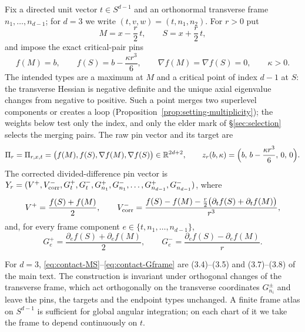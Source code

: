 \begin{definition}\label{def:contact-pins}
Fix a directed unit vector $t\in S^{d-1}$ and an orthonormal transverse frame $n_1,\dots,n_{d-1}$; for $d=3$ we write $(t,v,w)=(t,n_1,n_2)$. For $r>0$ put
\begin{equation}\label{eq:contact-MS}
M=x-\frac r2\,t,\qquad S=x+\frac r2\,t,
\end{equation}
and impose the exact critical-pair pins
\begin{equation}\label{eq:contact-pins}
f(M)=b,\qquad f(S)=b-\frac{\kappa r^3}6,\qquad\nabla f(M)=\nabla f(S)=0,\qquad\kappa>0 .
\end{equation}
The intended types are a maximum at $M$ and a critical point of index $d-1$ at $S$: the transverse Hessian is negative definite and the unique axial eigenvalue changes from negative to positive. Such a point merges two superlevel components or creates a loop (Proposition~\ref{prop:setting-multiplicity}); the weights below test only the index, and only the elder mark of \S\ref{sec:selection} selects the merging pairs. The raw pin vector and its target are
\begin{equation}\label{eq:contact-raw}
\Pi_r=\Pi_{r,x,t}=\bigl(f(M),f(S),\nabla f(M),\nabla f(S)\bigr)\in\mathbb R^{2d+2},\qquad z_r(b,\kappa)=\Bigl(b,\,b-\frac{\kappa r^3}6,\,0,\,0\Bigr).
\end{equation}
The corrected divided-difference pin vector is $Y_r=(V^+,V^-_{\rm corr},G^+_t,G^-_t,G^+_{n_1},G^-_{n_1},\dots,G^+_{n_{d-1}},G^-_{n_{d-1}})$, where
\begin{equation}\label{eq:contact-Vframe}
V^+=\frac{f(S)+f(M)}2,\qquad V^-_{\rm corr}=\frac{f(S)-f(M)-\frac r2\bigl(\partial_tf(S)+\partial_tf(M)\bigr)}{r^3},
\end{equation}
and, for every frame component $e\in\{t,n_1,\dots,n_{d-1}\}$,
\begin{equation}\label{eq:contact-Gframe}
G^+_e=\frac{\partial_ef(S)+\partial_ef(M)}2,\qquad G^-_e=\frac{\partial_ef(S)-\partial_ef(M)}r .
\end{equation}
\end{definition}

For $d=3$, \eqref{eq:contact-MS}--\eqref{eq:contact-Gframe} are (3.4)--(3.5) and (3.7)--(3.8) of the main text. The construction is invariant under orthogonal changes of the transverse frame, which act orthogonally on the transverse coordinates $G^\pm_{n_i}$ and leave the pins, the targets and the endpoint types unchanged. A finite frame atlas on $S^{d-1}$ is sufficient for global angular integration; on each chart of it we take the frame to depend continuously on $t$.

